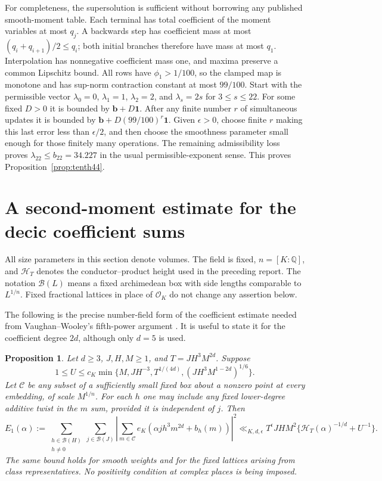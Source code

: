 \documentclass[11pt,reqno]{amsart}
\numberwithin{equation}{section}
\newtheorem{proposition}[theorem]{Proposition}
\theoremstyle{definition}
\begin{document}
For completeness, the supersolution is sufficient without borrowing any
published smooth-moment table.  Each terminal has total coefficient of the
moment variables at most $q_j$.  A backwards step has coefficient mass at
most $(q_i+q_{i+1})/2\le q_i$; both initial branches therefore have mass at
most $q_1$.  Interpolation has nonnegative coefficient mass one, and maxima
preserve a common Lipschitz bound.  All rows have $\phi_1>1/100$, so the
clamped map is monotone and has sup-norm contraction constant at most $99/100$.
Start with the permissible vector $\lambda_0=0$, $\lambda_1=1$,
$\lambda_2=2$, and $\lambda_s=2s$ for $3\le s\le22$.
For some fixed $D>0$ it is bounded by $\boldsymbol b+D\mathbf1$.
After any finite number $r$ of simultaneous updates it is bounded by
$\boldsymbol b+D(99/100)^r\mathbf1$.  Given $\epsilon>0$, choose finite
$r$ making this last error less than $\epsilon/2$, and then choose the
smoothness parameter small enough for those finitely many operations.
The remaining admissibility loss proves
$\lambda_{22}\le b_{22}=34.227$ in the usual permissible-exponent sense.
This proves Proposition~\ref{prop:tenth44}.


\section{A second-moment estimate for the decic coefficient sums}
\label{sec:k5-coeff2}

All size parameters in this section denote volumes.  The field is fixed,
$n=[K:\mathbb Q]$, and $\mathcal H_T$ denotes the conductor--product height
used in the preceding report.  The notation $\mathcal B(L)$ means a fixed
archimedean box with side lengths comparable to $L^{1/n}$.  Fixed fractional
lattices in place of $\mathcal O_K$ do not change any assertion below.

The following is the precise number-field form of the coefficient estimate
needed from Vaughan--Wooley's fifth-power argument \cite[Lemma~4.3]{VW1995}.  It is useful to state
it for the coefficient degree $2d$, although only $d=5$ is used.

\begin{proposition}\label{prop:k5-coeff2}
Let $d\ge3$, $J,H,M\ge1$, and $T=JH^3M^{2d}$.  Suppose
\[
 1\le U\le c_K\min\{M,JH^{-3},T^{1/(4d)},
                  (JH^3M^{1-2d})^{1/6}\}.
\]
Let $\mathcal C$ be any subset of a sufficiently small fixed box about a
nonzero point at every embedding, of scale $M^{1/n}$.  For each $h$ one may
include any fixed lower-degree additive twist in the $m$ sum, provided it
is independent of $j$.  Then
\[
 E_1(\alpha):=\sum_{\substack{h\in\mathcal B(H)\\h\ne0}}
 \sum_{j\in\mathcal B(J)}
 \left|\sum_{m\in\mathcal C}e_K(\alpha jh^3m^{2d}+b_h(m))\right|^2
 \ll_{K,d,\epsilon}T^\epsilon JHM^2
       \{\mathcal H_T(\alpha)^{-1/d}+U^{-1}\}.
\]
The same bound holds for smooth weights and for the fixed lattices arising
from class representatives.  No positivity condition at complex places is
being imposed.
\end{proposition}
\end{document}
